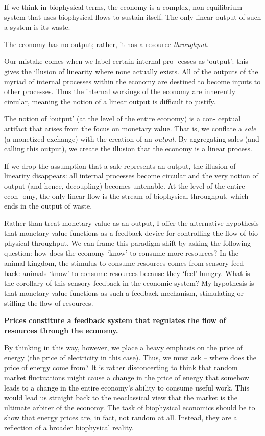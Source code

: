 \documentclass[
]{book}
\begin{document}
If we think
in biophysical terms, the economy is a complex, non-equilibrium system that uses
biophysical flows to sustain itself. The only linear output of such a system is its
waste.

The economy has no output; rather, it has a resource \emph{throughput}.

Our mistake comes when we label certain internal pro-
cesses as `output': this gives the illusion of linearity where none actually exists. All
of the outputs of the myriad of internal processes within the economy are destined
to become inputs to other processes. Thus the internal workings of the economy are
inherently circular, meaning the notion of a linear output is difficult to justify.

The notion of `output' (at the level of the entire economy) is a con-
ceptual artifact that arises from the focus on monetary value. That is, we conflate a
\emph{sale} (a monetized exchange) with the creation of an \emph{output}.
By aggregating sales
(and calling this output), we create the illusion that the economy is a linear process.

If we drop the assumption that a sale represents an output, the illusion of
linearity disappears: all internal processes become circular and the very notion of
output (and hence, decoupling) becomes untenable. At the level of the entire econ-
omy, the only linear flow is the stream of biophysical throughput, which ends in the
output of waste.

Rather than treat monetary value as an output, I offer the alternative hypothesis
that monetary value functions as a feedback device for controlling the flow of bio-
physical throughput. We can frame this paradigm shift by asking
the following question: how does the economy `know' to consume more resources?
In the animal kingdom, the stimulus to consume resources comes from sensory feed-
back: animals `know' to consume resources because they `feel' hungry. What is the
corollary of this sensory feedback in the economic system? My hypothesis is that
monetary value functions as such a feedback mechanism, stimulating or stifling the
flow of resources.

\textbf{Prices constitute a feedback system that regulates the flow of resources
through the economy.}

By thinking in this way, however, we place a heavy emphasis on the price of
energy (the price of electricity in this case). Thus, we must ask -- where does the
price of energy come from? It is rather disconcerting to think that random market
fluctuations might cause a change in the price of energy that somehow leads to a
change in the entire economy's ability to consume useful work. This would lead us
straight back to the neoclassical view that the market is the ultimate arbiter of the
economy. The task of biophysical economics should be to show that energy prices
are, in fact, not random at all. Instead, they are a reflection of a broader biophysical
reality.
\end{document}
